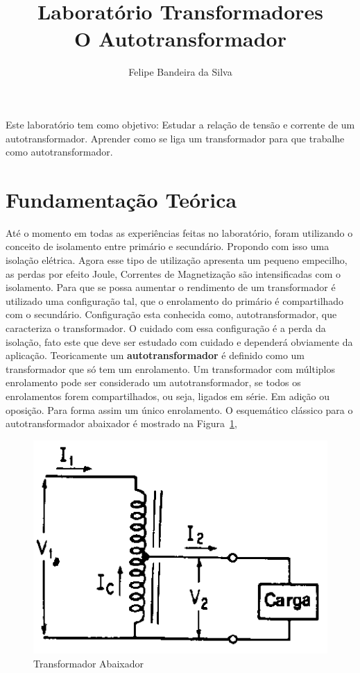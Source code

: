 \documentclass[paper=a4, fontsize=11pt]{article}
\title{Laboratório Transformadores\\O Autotransformador}
\author{Felipe Bandeira da Silva}
\date{}
\begin{document}
\maketitle

Este laboratório tem como objetivo: Estudar a relação de tensão e corrente de um autotransformador. 
Aprender como se liga um transformador para que trabalhe como autotransformador.

\newpage

\listoffigures

\newpage

\section{Fundamentação Teórica}

Até o momento em todas as experiências feitas no laboratório, foram utilizando o conceito
de isolamento entre primário e secundário. Propondo com isso uma isolação elétrica. Agora 
esse tipo de utilização apresenta um pequeno empecilho, as perdas por efeito Joule, Correntes
de Magnetização são intensificadas com o isolamento. Para que se possa aumentar o rendimento
de um transformador é utilizado uma configuração tal, que o enrolamento do primário é 
compartilhado com o secundário. Configuração esta conhecida como, autotransformador, que 
caracteriza o transformador. O cuidado com essa configuração é a perda da isolação, fato
este que deve ser estudado com cuidado e dependerá obviamente da aplicação. Teoricamente
um \textbf{autotransformador} é definido como um transformador que só tem um enrolamento. 
Um transformador com múltiplos enrolamento pode ser considerado um autotransformador, se todos os 
enrolamentos forem compartilhados, ou seja, ligados em série. Em adição ou oposição. Para
forma assim um único enrolamento. O esquemático clássico para o autotransformador  abaixador
é mostrado na Figura~\ref{abaixador},

\begin{figure}[!ht]
    \centering
    \includegraphics[scale=.4]{abaixador.png}
    \caption{Transformador Abaixador}
    \label{abaixador}
\end{figure}
\end{document}
